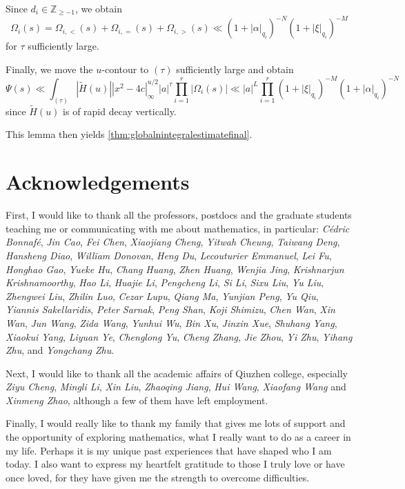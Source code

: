 \documentclass[10pt,oneside,reqno]{amsart}
\makeatletter
\newcommand\ZZ{\mathbb{Z}}
\renewcommand\geq{\geqslant}
\theoremstyle{THEOREM}
\theoremstyle{DEFINITION}
\theoremstyle{EXERCISE}
\numberwithin{equation}{section}
\renewenvironment{proof}[1][\proofname]{\par
  \vspace{-6pt}
  \pushQED{\qed}
  \normalfont \topsep6\p@\@plus6\p@\relax
  \trivlist
  \item[\hskip\labelsep\rmfamily\bfseries
    #1\@addpunct{:}]\ignorespaces
}{
  \popQED\endtrivlist\@endpefalse
  \vspace{-6pt}
}
\newenvironment{insertproof}[1][\proofname]{\renewcommand\qedsymbol{$\blacksquare$}
  \par
  \vspace{-6pt}
  \pushQED{\qed}
  \normalfont \topsep6\p@\@plus6\p@\relax
  \trivlist
  \item[\hskip\labelsep\rmfamily\bfseries
    #1\@addpunct{:}]\ignorespaces
}{
  \popQED\endtrivlist\@endpefalse
  \vspace{-6pt}
}
\makeatother
\begin{document}
\begin{proof}
\begin{insertproof}
Since $d_i\in \ZZ_{\geq -1}$, we obtain
\[
\Omega_i(s)=\Omega_{i,<}(s)+\Omega_{i,=}(s)+\Omega_{i,>}(s)\ll (1+|\alpha|_{q_i})^{-N}(1+|\xi|_{q_i})^{-M}
\]
for $\tau$ sufficiently large.

Finally, we move the $u$-contour to $(\tau)$ sufficiently large and obtain
\[
\Psi(s)
\ll\int_{(\tau)}|\widetilde{H}(u)||x^2-4c|_\infty^{u/2}|a|^\tau\prod_{i=1}^{r} |\Omega_i(s)|\ll |a|^L\prod_{i=1}^{r}(1+|\xi|_{q_i})^{-M}(1+|\alpha|_{q_i})^{-N}
\]
since $\widetilde{H}(u)$ is of rapid decay vertically.
\end{insertproof}
This lemma then yields \autoref{thm:globalnintegralestimatefinal}.
\end{proof}

\section*{Acknowledgements}
First, I would like to thank all the professors, postdocs and the graduate students teaching me or communicating with me about mathematics, in particular: \emph{C\'edric Bonnaf\'e}, \emph{Jin Cao}, \emph{Fei Chen}, \emph{Xiaojiang Cheng}, \emph{Yitwah Cheung}, \emph{Taiwang Deng}, \emph{Hansheng Diao}, \emph{William Donovan}, \emph{Heng Du}, \emph{Lecouturier Emmanuel}, \emph{Lei Fu}, \emph{Honghao Gao}, \emph{Yueke Hu}, \emph{Chang Huang}, \emph{Zhen Huang}, \emph{Wenjia Jing}, \emph{Krishnarjun Krishnamoorthy}, \emph{Hao Li}, \emph{Huajie Li}, \emph{Pengcheng Li}, \emph{Si Li}, \emph{Sixu Liu}, \emph{Yu Liu}, \emph{Zhengwei Liu}, \emph{Zhilin Luo}, \emph{Cezar Lupu}, \emph{Qiang Ma}, \emph{Yunjian Peng}, \emph{Yu Qiu}, \emph{Yiannis Sakellaridis}, \emph{Peter Sarnak}, \emph{Peng Shan}, \emph{Koji Shimizu}, \emph{Chen Wan}, \emph{Xin Wan}, \emph{Jun Wang}, \emph{Zida Wang}, \emph{Yunhui Wu}, \emph{Bin Xu}, \emph{Jinxin Xue}, \emph{Shuhang Yang}, \emph{Xiaokui Yang}, \emph{Liyuan Ye}, \emph{Chenglong Yu}, \emph{Cheng Zhang}, \emph{Jie Zhou}, \emph{Yi Zhu}, \emph{Yihang Zhu}, and \emph{Yongchang Zhu}.

Next, I would like to thank all the academic affairs of Qiuzhen college, especially \emph{Ziyu Cheng}, \emph{Mingli Li}, \emph{Xin Liu}, \emph{Zhaoqing Jiang}, \emph{Hui Wang}, \emph{Xiaofang Wang} and \emph{Xinmeng Zhao}, although a few of them have left employment.

Finally, I would really like to thank my family that gives me lots of support and the opportunity of exploring mathematics, what I really want to do as a career in my life. Perhaps it is my unique past experiences that have shaped who I am today. I also want to express my heartfelt gratitude to those I truly love or have once loved, for they have given me the strength to overcome difficulties.

\nocite{cheng2026}


\end{document}
